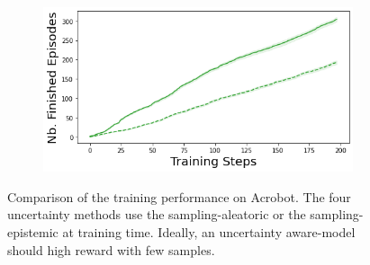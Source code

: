 \begin{figure}
\begin{subfigure}{.245\textwidth}
    \end{subfigure}
    \begin{subfigure}{.245\textwidth}
        \includegraphics[width=\textwidth]{sections/011_icml2022/resources/acrobot-n_finished_training_episodes-postnet-training-strategy.png}
    \end{subfigure}
    \caption{Comparison of the training performance on Acrobot. The four uncertainty methods use the sampling-aleatoric or the sampling-epistemic at training time. Ideally, an uncertainty aware-model should high reward with few samples.}
    \label{fig:strategy-training-performance-acrobot}
\end{figure}
